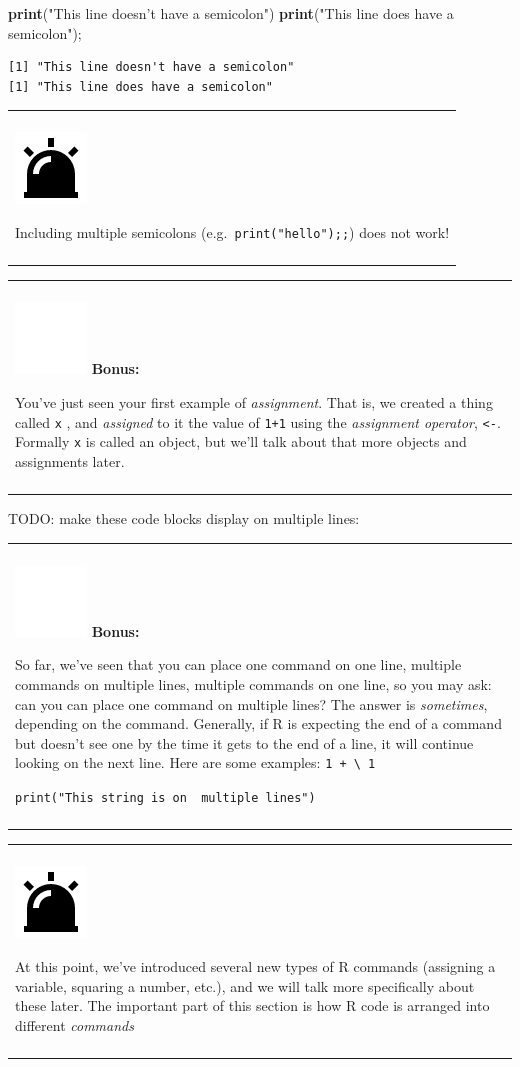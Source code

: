 \documentclass[
]{book}
\newenvironment{Shaded}{\begin{snugshade}}{\end{snugshade}}
\newcommand{\KeywordTok}[1]{\textcolor[rgb]{0.13,0.29,0.53}{\textbf{#1}}}
\newcommand{\NormalTok}[1]{#1}
\newcommand{\StringTok}[1]{\textcolor[rgb]{0.31,0.60,0.02}{#1}}
\newenvironment{bonus}
{
  \begin{center}
  \begin{tabular}{|>{\columncolor{bonus}\color{white}}p{0.9\textwidth}|}\hline\\
  \includegraphics[scale=0.1]{src/images/sun-fill-invert.png}
  \textbf{Bonus:}
}
{\\\\\hline
  \end{tabular}
  \end{center}
}
\newenvironment{caution}
{
  \begin{center}
  \begin{tabular}{|>{\columncolor{caution}}p{0.9\textwidth}|}
  \hline\\
  \includegraphics[scale=0.1]{src/images/alarm-warning-fill.png}
}
{\\\\\hline
  \end{tabular}
  \end{center}
}
\begin{document}
\begin{Shaded}
\begin{Highlighting}[]
\KeywordTok{print}\NormalTok{(}\StringTok{"This line doesn't have a semicolon"}\NormalTok{)}
\KeywordTok{print}\NormalTok{(}\StringTok{"This line does have a semicolon"}\NormalTok{);}
\end{Highlighting}
\end{Shaded}

\begin{verbatim}
[1] "This line doesn't have a semicolon"
[1] "This line does have a semicolon"
\end{verbatim}

\begin{caution}
Including multiple semicolons (e.g.~\texttt{print("hello");;}) does not
work!
\end{caution}

\begin{bonus}
You've just seen your first example of \emph{assignment}. That is, we
created a thing called \texttt{x} , and \emph{assigned} to it the value
of \texttt{1+1} using the \emph{assignment operator},
\texttt{\textless{}-}. Formally \texttt{x} is called an object, but
we'll talk about that more objects and assignments later.
\end{bonus}

TODO: make these code blocks display on multiple lines:

\begin{bonus}
So far, we've seen that you can place one command on one line, multiple
commands on multiple lines, multiple commands on one line, so you may
ask: can you can place one command on multiple lines? The answer is
\emph{sometimes}, depending on the command. Generally, if R is expecting
the end of a command but doesn't see one by the time it gets to the end
of a line, it will continue looking on the next line. Here are some
examples: \texttt{1\ +\ \textbackslash{}\ 1}

\texttt{print("This\ string\ is\ on\ \ multiple\ lines")}
\end{bonus}

\begin{caution}
At this point, we've introduced several new types of R commands
(assigning a variable, squaring a number, etc.), and we will talk more
specifically about these later. The important part of this section is
how R code is arranged into different \emph{commands}
\end{caution}
\end{document}
